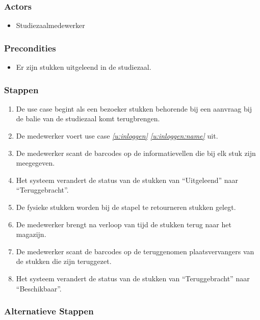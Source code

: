 \documentclass[a4paper,titlepage]{report}
\def\namedref#1{\ref{#1} \ref{#1:name}}
\begin{document}
      \subsubsection{Actors}
        \begin{itemize}
          \item Studiezaalmedewerker
        \end{itemize}
      \subsubsection{Precondities}
        \begin{itemize}
          \item Er zijn stukken uitgeleend in de studiezaal.
        \end{itemize}
      \subsubsection{Stappen}
        \begin{enumerate}
          \item\label{u:retour:begin}
            De use case begint als een bezoeker stukken behorende bij een
            aanvraag bij de balie van de studiezaal komt terugbrengen.
          \item De medewerker voert use case \textit{\namedref{u:inloggen}}
            uit.
          \item De medewerker scant de barcodes op de informatievellen die bij
          elk stuk zijn meegegeven.
          \item Het systeem verandert de status van de stukken van
            ``Uitgeleend'' naar ``Teruggebracht''.
          \item De fysieke stukken worden bij de stapel te retourneren stukken
            gelegt.
          \item De medewerker brengt na verloop van tijd de stukken terug naar
            het magazijn.
          \item De medewerker scant de barcodes op de teruggenomen
            plaatsvervangers van de stukken die zijn teruggezet.
          \item Het systeem verandert de status van de stukken van
            ``Teruggebracht'' naar ``Beschikbaar''.
        \end{enumerate}
      \subsubsection{Alternatieve Stappen}
\end{document}
